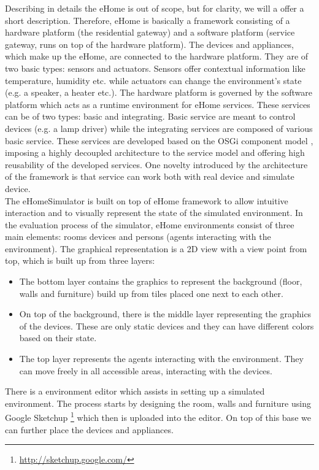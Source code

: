 Describing in details the eHome is out of scope, but for clarity, we will a offer a short description. Therefore, eHome is basically a framework consisting of a hardware platform (the residential gateway) and a software platform (service gateway, runs on top of the hardware platform). The devices and appliances, which make up the eHome, are connected to the hardware platform. They are of two basic types: sensors and actuators. Sensors offer contextual information like temperature, humidity etc. while actuators can change the environment's state (e.g. a speaker, a heater etc.). The hardware platform is governed by the software platform which acts as a runtime environment for eHome services. These services can be of two types: basic and integrating. Basic service are meant to control devices (e.g. a lamp driver) while the integrating services are composed of various basic service. These services are developed based on the OSGi component model \cite{allianceosgi}, imposing a highly decoupled architecture to the service model and offering high reusability of the developed services. One novelty introduced by the architecture of the framework is that service can work both with real device and simulate device.\\

The eHomeSimulator is built on top of eHome framework to allow intuitive interaction and to visually represent the state of the simulated environment. In the evaluation process of the simulator, eHome environments consist of three main elements: rooms devices and persons (agents interacting with the environment). The graphical representation is a 2D view with a view point from top, which is built up from three layers:
\begin{itemize}
	\item The bottom layer contains the graphics to represent the background (floor, walls and furniture) build up from tiles placed one next to each other.
	\item On top of the background, there is the middle layer representing the graphics of the devices. These are only static devices and they can have different colors based on their state.
	\item The top layer represents the agents interacting with the environment. They can move freely in all accessible areas, interacting with the devices.
\end{itemize}

There is a environment editor which assists in setting up a simulated environment. The process starts by designing the room, walls and furniture using Google Sketchup \footnote{\url{http://sketchup.google.com/}} which then is uploaded into the editor. On top of this base we can further place the devices and appliances.\\

